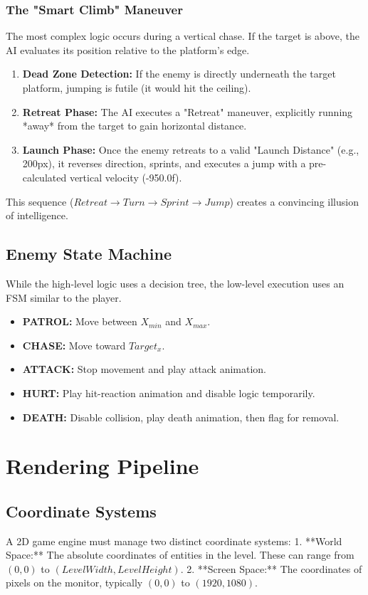 \documentclass[10pt, a4paper]{article}
\begin{document}
\subsubsection{The "Smart Climb" Maneuver}
The most complex logic occurs during a vertical chase. If the target is above, the AI evaluates its position relative to the platform's edge.
\begin{enumerate}
    \item \textbf{Dead Zone Detection:} If the enemy is directly underneath the target platform, jumping is futile (it would hit the ceiling).
    \item \textbf{Retreat Phase:} The AI executes a "Retreat" maneuver, explicitly running *away* from the target to gain horizontal distance.
    \item \textbf{Launch Phase:} Once the enemy retreats to a valid "Launch Distance" (e.g., 200px), it reverses direction, sprints, and executes a jump with a pre-calculated vertical velocity (-950.0f). 
\end{enumerate}
This sequence ($Retreat \rightarrow Turn \rightarrow Sprint \rightarrow Jump$) creates a convincing illusion of intelligence.

\subsection{Enemy State Machine}
While the high-level logic uses a decision tree, the low-level execution uses an FSM similar to the player.
\begin{itemize}
    \item \textbf{PATROL:} Move between $X_{min}$ and $X_{max}$.
    \item \textbf{CHASE:} Move toward $Target_{x}$.
    \item \textbf{ATTACK:} Stop movement and play attack animation.
    \item \textbf{HURT:} Play hit-reaction animation and disable logic temporarily.
    \item \textbf{DEATH:} Disable collision, play death animation, then flag for removal.
\end{itemize}

\newpage

\section{Rendering Pipeline}

\subsection{Coordinate Systems}
A 2D game engine must manage two distinct coordinate systems:
1.  **World Space:** The absolute coordinates of entities in the level. These can range from $(0,0)$ to $(LevelWidth, LevelHeight)$.
2.  **Screen Space:** The coordinates of pixels on the monitor, typically $(0,0)$ to $(1920, 1080)$.
\end{document}
